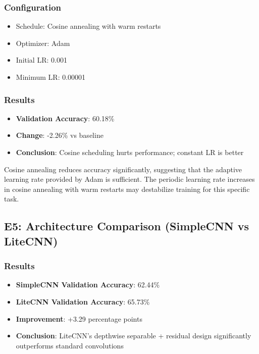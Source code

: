 \documentclass[12pt,a4paper]{article}
\begin{document}
\subsubsection{Configuration}
\begin{itemize}[leftmargin=*]
    \item Schedule: Cosine annealing with warm restarts
    \item Optimizer: Adam
    \item Initial LR: 0.001
    \item Minimum LR: 0.00001
\end{itemize}

\subsubsection{Results}
\begin{itemize}[leftmargin=*]
    \item \textbf{Validation Accuracy}: 60.18\%
    \item \textbf{Change}: -2.26\% vs baseline
    \item \textbf{Conclusion}: Cosine scheduling hurts performance; constant LR is better
\end{itemize}

Cosine annealing reduces accuracy significantly, suggesting that the adaptive learning rate provided by Adam is sufficient. The periodic learning rate increases in cosine annealing with warm restarts may destabilize training for this specific task.


\subsection{E5: Architecture Comparison (SimpleCNN vs LiteCNN)}

\subsubsection{Results}
\begin{itemize}[leftmargin=*]
    \item \textbf{SimpleCNN Validation Accuracy}: 62.44\%
    \item \textbf{LiteCNN Validation Accuracy}: 65.73\%
    \item \textbf{Improvement}: +3.29 percentage points
    \item \textbf{Conclusion}: LiteCNN's depthwise separable + residual design significantly outperforms standard convolutions
\end{itemize}
\end{document}
